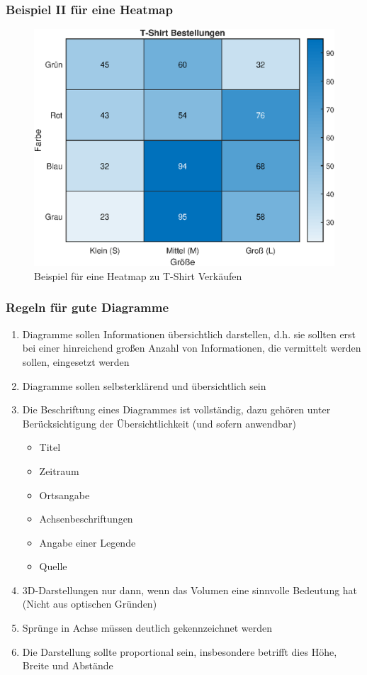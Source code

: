 \begin{frame}
\frametitle{Beispiel II für eine Heatmap}
\begin{figure}[hbtp]
\centering
\includegraphics[scale=0.55]{images/plot_heatmap_tshirt.eps}
\caption{Beispiel für eine Heatmap zu T-Shirt Verkäufen}
\end{figure}

\end{frame}
\begin{frame}
\frametitle{Regeln für gute Diagramme}
\begin{enumerate}[<+->]
\item Diagramme sollen Informationen übersichtlich darstellen, d.h. sie sollten erst bei einer hinreichend großen Anzahl von Informationen, die vermittelt werden sollen, eingesetzt werden
\item Diagramme sollen selbsterklärend und übersichtlich sein
\item Die Beschriftung eines Diagrammes ist vollständig, dazu gehören unter Berücksichtigung der Übersichtlichkeit (und sofern anwendbar)
\begin{itemize}[<+->]
\item Titel
\item Zeitraum
\item Ortsangabe
\item Achsenbeschriftungen
\item Angabe einer Legende
\item Quelle
\end{itemize}
\item 3D-Darstellungen nur dann, wenn das Volumen eine sinnvolle Bedeutung hat (Nicht aus optischen Gründen)
\item Sprünge in Achse müssen deutlich gekennzeichnet werden
\item Die Darstellung sollte proportional sein, insbesondere betrifft dies Höhe, Breite und Abstände
\end{enumerate}
\end{frame}